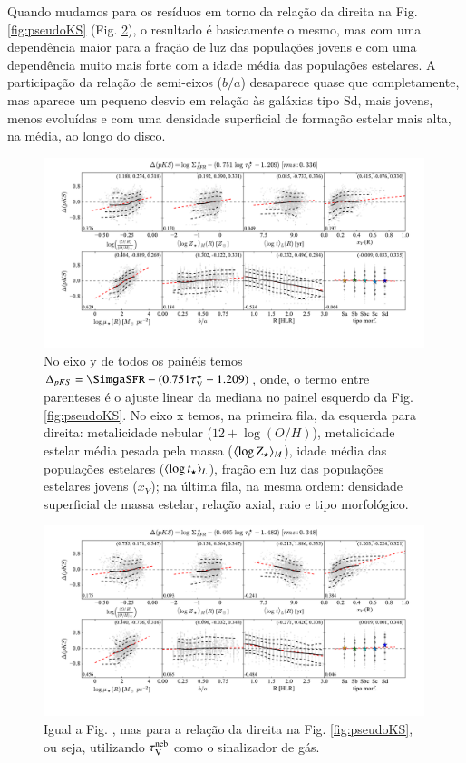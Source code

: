 Quando mudamos para os resíduos em torno da relação da direita na Fig. \ref{fig:pseudoKS} (Fig.
\ref{fig:pseudoKSresid_neb}), o resultado é basicamente o mesmo, mas com uma dependência maior para
a fração de luz das populações jovens e com uma dependência muito mais forte com a idade média das
populações estelares. A participação da relação de semi-eixos ($b/a$) desaparece quase que
completamente, mas aparece um pequeno desvio em relação às galáxias tipo Sd, mais jovens, menos
evoluídas e com uma densidade superficial de formação estelar mais alta, na média, ao longo do
disco.

\begin{figure}
	\centering
	\includegraphics[width=0.99\textwidth]{figuras/deltapKS.pdf}
	\caption[Resíduos da {\em pseudo-KS}.]
	{No eixo y de todos os painéis temos $\Delta_{pKS} = \SimgaSFR - (0.751 \tauVS - 1.209)$, onde, o
termo entre parenteses é o ajuste linear da mediana no painel esquerdo da Fig. \ref{fig:pseudoKS}.
No eixo x temos, na primeira fila, da esquerda para direita: metalicidade nebular ($12 + \log
(O/H)$), metalicidade estelar média pesada pela massa ($\meanM{\log Z_\star}$), idade média das
populações estelares ($\meanL{\log t_\star}$), fração em luz das populações estelares jovens
($x_Y$); na última fila, na mesma ordem: densidade superficial de massa estelar, relação axial, raio
e tipo morfológico.}
	\label{fig:pseudoKSresid}
\end{figure}

\begin{figure}
	\centering
	\includegraphics[width=0.99\textwidth]{figuras/deltapKS_neb.pdf}
	\caption[Resíduos da {\em pseudo-KS}.]
	{Igual a Fig. , mas para a relação da direita na Fig. \ref{fig:pseudoKS}, ou
seja, utilizando $\tau_{\mathrm{V}}^{\mathrm{neb}}$ como o sinalizador de gás. }
	\label{fig:pseudoKSresid_neb}
\end{figure}


